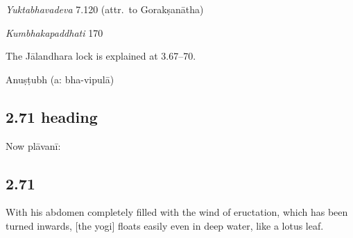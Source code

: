 \begin{ekdosis}
\begin{sources}[hp02_070]
\emph{Yuktabhavadeva} 7.120 (attr.~to Gorakṣanātha)

\begin{versinnote}
\end{versinnote}

\emph{Kumbhakapaddhati} 170

\begin{versinnote}
\end{versinnote}
\end{sources}

\begin{philcomm}[hp02_070]
The Jālandhara lock is explained at 3.67–70. 
\end{philcomm}

\begin{metre}[hp02_070]
Anuṣṭubh (a: bha-vipulā)
\end{metre}

\subsection*{2.71 heading}
\begin{translation}[hp02_071a]
Now plāvanī:
\end{translation}


\subsection*{2.71}
\begin{translation}[hp02_071]
With his abdomen completely filled with the wind of eructation, which has been turned inwards, [the yogi] floats easily even in deep water, like a lotus leaf.
\end{translation}

\begin{testimonia}[hp02_071]


\end{testimonia}
\end{ekdosis}
